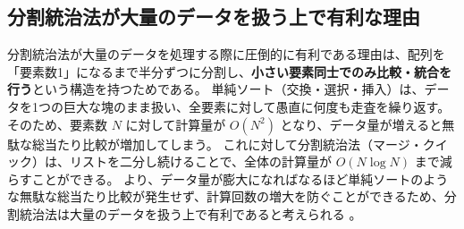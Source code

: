 \documentclass[titlepage]{ltjsarticle}
\begin{document}
\subsection{分割統治法が大量のデータを扱う上で有利な理由}
分割統治法が大量のデータを処理する際に圧倒的に有利である理由は、配列を「要素数1」になるまで半分ずつに分割し、\textbf{小さい要素同士でのみ比較・統合を行う}という構造を持つためである。
単純ソート（交換・選択・挿入）は、データを1つの巨大な塊のまま扱い、全要素に対して愚直に何度も走査を繰り返す。
そのため、要素数 $N$ に対して計算量が $O(N^2)$ となり、データ量が増えると無駄な総当たり比較が増加してしまう。
これに対して分割統治法（マージ・クイック）は、リストを二分し続けることで、全体の計算量が $O(N \log N)$ まで減らすことができる。
より、データ量が膨大になればなるほど単純ソートのような無駄な総当たり比較が発生せず、計算回数の増大を防ぐことができるため、分割統治法は大量のデータを扱う上で有利であると考えられる
。
\end{document}

